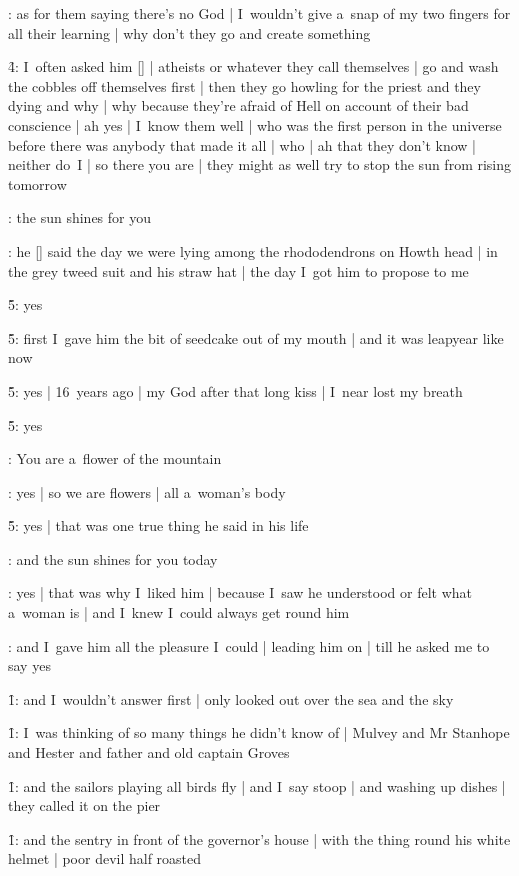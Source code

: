 :
as for them saying there's no God |
I~wouldn't give a~snap of my two fingers for all their learning |
why don't they go and create something

\f4:
I~often asked him [\bloom] |
atheists or whatever they call themselves |
go and wash the cobbles off themselves first |
then they go howling for the priest and they dying and why |
why because they're afraid of Hell on account of their bad conscience |
ah yes |
I~know them well |
who was the first person in the universe before there was anybody
that made it all |
who |
ah that they don't know |
neither do~I |
so there you are |
they might as well try to stop the sun from rising tomorrow

:
the sun shines for you

:
he [\bloom] said the day we were lying among the rhododendrons on Howth head |
in the grey tweed suit and his straw hat |
the day I~got him to propose to me

\f5:
yes

\f5:
first I~gave him the bit of seedcake out of my mouth |
and it was leapyear like now

\f5:
yes |
16~years ago |
my God after that long kiss |
I~near lost my breath

\f5:
yes

:
You are a~flower of the mountain

:
yes |
so we are flowers |
all a~woman's body

\f5:
yes |
that was one true thing he said in his life

:
and the sun shines for you today

:
yes |
that was why I~liked him |
because I~saw he understood or felt what a~woman is |
and I~knew I~could always get round him

:
and I~gave him all the pleasure I~could |
leading him on |
till he asked me to say yes

\f1:
and I~wouldn't answer first |
only looked out over the sea and the sky

\f1:
I~was thinking of so many things he didn't know of |
Mulvey and Mr Stanhope and Hester and father and old captain Groves

\f1:
and the sailors playing all birds fly |
and I~say stoop |
and washing up dishes |
they called it on the pier

\f1:
and the sentry in front of the governor's house |
with the thing round his white helmet |
poor devil half roasted

